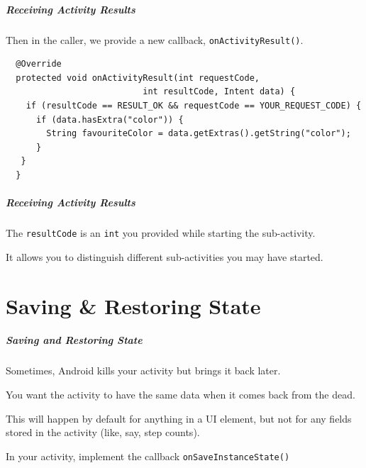 \begin{frame}[fragile]
\frametitle{Receiving Activity Results}
\begin{changemargin}{1cm}

Then in the caller, we provide a new callback, {\tt onActivityResult()}.

{\scriptsize
\begin{verbatim}
  @Override
  protected void onActivityResult(int requestCode, 
                           int resultCode, Intent data) {
    if (resultCode == RESULT_OK && requestCode == YOUR_REQUEST_CODE) {
      if (data.hasExtra("color")) {
        String favouriteColor = data.getExtras().getString("color");
      }
   }
  }
\end{verbatim}
}

\end{changemargin}
\end{frame}

\begin{frame}[fragile]
\frametitle{Receiving Activity Results}
\begin{changemargin}{1cm}


The {\tt resultCode} is an {\tt int} you provided while starting the
sub-activity. 

It allows you to distinguish different sub-activities you
may have started.



\end{changemargin}
\end{frame}



\part{Saving \& Restoring State}
\frame{\partpage}

\begin{frame}
\frametitle{Saving and Restoring State}
\begin{changemargin}{1cm}
Sometimes, Android kills your activity but brings it back later.

You want the activity to have the same data when it comes back from the
dead.

This will happen by default for anything in a UI element, but
not for any fields stored in the activity (like, say, step counts).

In your activity, implement the callback {\tt onSaveInstanceState()}

\end{changemargin}
\end{frame}


